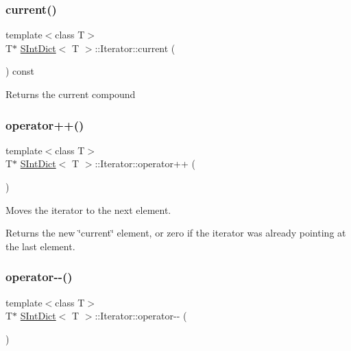 \subsubsection{\texorpdfstring{current()}{current()}}
{\footnotesize\ttfamily template$<$class T$>$ \\
T$\ast$ \mbox{\hyperlink{class_s_int_dict}{S\+Int\+Dict}}$<$ T $>$\+::Iterator\+::current (\begin{DoxyParamCaption}{ }\end{DoxyParamCaption}) const\hspace{0.3cm}{\ttfamily [inline]}}

Returns the current compound \mbox{\label{class_s_int_dict_1_1_iterator_adefe5ae758222ef7519636012292fd40}} 
\subsubsection{\texorpdfstring{operator++()}{operator++()}}
{\footnotesize\ttfamily template$<$class T$>$ \\
T$\ast$ \mbox{\hyperlink{class_s_int_dict}{S\+Int\+Dict}}$<$ T $>$\+::Iterator\+::operator++ (\begin{DoxyParamCaption}{ }\end{DoxyParamCaption})\hspace{0.3cm}{\ttfamily [inline]}}

Moves the iterator to the next element. \begin{DoxyReturn}{Returns}
the new \char`\"{}current\char`\"{} element, or zero if the iterator was already pointing at the last element. 
\end{DoxyReturn}
\mbox{\label{class_s_int_dict_1_1_iterator_a9c0a5a230cfd2418781e9e837534c651}} 
\subsubsection{\texorpdfstring{operator-\/-\/()}{operator--()}}
{\footnotesize\ttfamily template$<$class T$>$ \\
T$\ast$ \mbox{\hyperlink{class_s_int_dict}{S\+Int\+Dict}}$<$ T $>$\+::Iterator\+::operator-\/-\/ (\begin{DoxyParamCaption}{ }\end{DoxyParamCaption})\hspace{0.3cm}{\ttfamily [inline]}}

